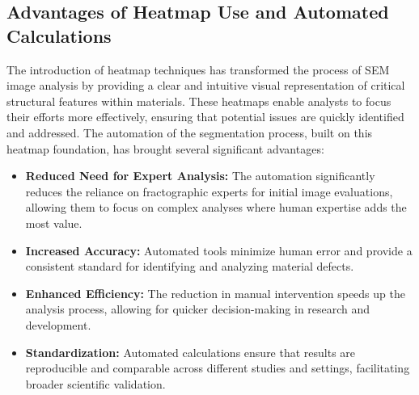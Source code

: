 \documentclass[preprint,12pt]{elsarticle}
\begin{document}
\begin{itemize}
\subsection{Advantages of Heatmap Use and Automated Calculations}
The introduction of heatmap techniques has transformed the process of SEM image analysis by providing a clear and intuitive visual representation of critical structural features within materials. These heatmaps enable analysts to focus their efforts more effectively, ensuring that potential issues are quickly identified and addressed. The automation of the segmentation process, built on this heatmap foundation, has brought several significant advantages:
\begin{itemize}
    \item \textbf{Reduced Need for Expert Analysis:} The automation significantly reduces the reliance on fractographic experts for initial image evaluations, allowing them to focus on complex analyses where human expertise adds the most value.
    \item \textbf{Increased Accuracy:} Automated tools minimize human error and provide a consistent standard for identifying and analyzing material defects.
    \item \textbf{Enhanced Efficiency:} The reduction in manual intervention speeds up the analysis process, allowing for quicker decision-making in research and development.
    \item \textbf{Standardization:} Automated calculations ensure that results are reproducible and comparable across different studies and settings, facilitating broader scientific validation.
\end{itemize}


\end{itemize}
\end{document}
